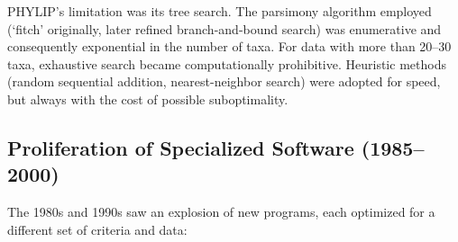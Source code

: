 PHYLIP's limitation was its tree search. The parsimony algorithm employed (`fitch' originally, later refined branch-and-bound search) was enumerative and consequently exponential in the number of taxa. For data with more than 20--30 taxa, exhaustive search became computationally prohibitive. Heuristic methods (random sequential addition, nearest-neighbor search) were adopted for speed, but always with the cost of possible suboptimality.

\subsection{Proliferation of Specialized Software (1985--2000)}

The 1980s and 1990s saw an explosion of new programs, each optimized for a different set of criteria and data:

